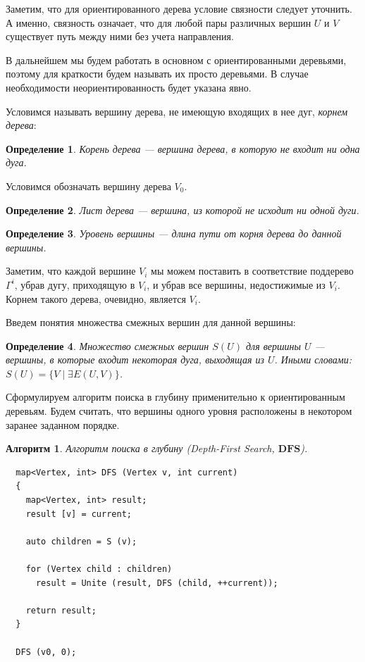 \documentclass[12pt,a4paper]{amsart}
\newtheorem{algo}{Алгоритм}
\newtheorem{defin}{Определение}
\begin{document}
Заметим, что для ориентированного дерева условие связности следует
уточнить. А именно, связность означает, что для любой пары различных
вершин $U$ и $V$ существует путь между ними без учета направления.

В дальнейшем мы будем работать в основном с ориентированными деревьями,
поэтому для краткости будем называть их просто деревьями. В случае
необходимости неориентированность будет указана явно.

Условимся называть вершину дерева, не имеющую входящих в нее дуг,
\emph{корнем дерева}:

\begin{defin}
  Корень дерева --- вершина дерева, в которую не входит ни одна дуга.
\end{defin}

Условимся обозначать вершину дерева $V_0$.

\begin{defin}
  Лист дерева --- вершина, из которой не исходит ни одной дуги.
\end{defin}

\begin{defin}
  Уровень вершины --- длина пути от корня дерева до данной вершины.
\end{defin}

Заметим, что каждой вершине $V_i$ мы можем поставить в соответствие
поддерево $\Gamma^i$, убрав дугу, приходящую в $V_i$, и убрав все вершины,
недостижимые из $V_i$. Корнем такого дерева, очевидно, является $V_i$.

Введем понятия множества смежных вершин для данной вершины:

\begin{defin}
  Множество смежных вершин $S(U)$ для вершины $U$ --- вершины, в которые
  входит некоторая дуга, выходящая из $U$. Иными словами:
  $S(U) = \{ V \mid \exists E (U, V) \}$.
\end{defin}

Сформулируем алгоритм поиска в глубину применительно к ориентированным
деревьям. Будем считать, что вершины одного уровня расположены в некотором
заранее заданном порядке.

\begin{algo}
  Алгоритм поиска в глубину (Depth-First Search, $\mathbf{DFS}$).
\end{algo}
\begin{lstlisting}
  map<Vertex, int> DFS (Vertex v, int current)
  {
	map<Vertex, int> result;
	result [v] = current;

	auto children = S (v);

	for (Vertex child : children)
	  result = Unite (result, DFS (child, ++current));

	return result;
  }

  DFS (v0, 0);
\end{lstlisting}
\end{document}

